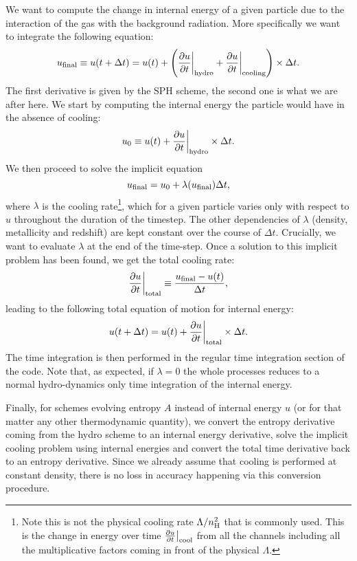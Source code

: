 \documentclass[fleqn, usenatbib, useAMS, a4paper]{mnras}
\begin{document}
We want to compute the change in internal energy of a given particle
due to the interaction of the gas with the background radiation. More
specifically we want to integrate the following equation:
\begin{equation}
  u_{\rm final} \equiv u(t+\Delta t) = u(t) + \left(\frac{\partial u}{\partial t}\bigg|_{\rm
    hydro} + \frac{\partial u}{\partial t}\bigg|_{\rm cooling}\right)
  \times \Delta t.
\end{equation}
The first derivative is given by the SPH scheme, the second one is
what we are after here. We start by computing the internal energy the
particle would have in the absence of cooling:
\begin{equation}
  u_0 \equiv u(t) + \frac{\partial u}{\partial t}\bigg|_{\rm
    hydro} \times \Delta t.
\end{equation}
We then proceed to solve the implicit equation
\begin{equation}
 u_{\rm final} = u_0 + \lambda(u_{\rm final}) \Delta t,
\end{equation}
where $\lambda$ is the cooling rate\footnote{Note this is not the
  physical cooling rate $\Lambda/n_{\rm H}^2$ that is commonly
  used. This is the change in energy over time $\frac{\partial
    u}{\partial t}\big|_{\rm cool}$ from all the channels
  including all the multiplicative factors coming in front of the
  physical $\Lambda$.}, which for a given particle varies
only with respect to $u$ throughout the duration of the timestep. The
other dependencies of $\lambda$ (density, metallicity and redshift)
are kept constant over the course of $\Delta t$. Crucially, we want to
evaluate $\lambda$ at the end of the time-step. Once a solution to this
implicit problem has been found, we get the total cooling rate:
\begin{equation}
  \frac{\partial u}{\partial t}\bigg|_{\rm total} \equiv \frac{u_{\rm final} -
    u(t)}{\Delta t},
\end{equation}
leading to the following total equation of motion for internal energy:
\begin{equation}
  u(t+\Delta t) = u(t) + \frac{\partial u}{\partial t}\bigg|_{\rm
    total} \times \Delta t.
\end{equation}
The time integration is then performed in the regular time integration
section of the code. Note that, as expected, if $\lambda=0$ the whole
processes reduces to a normal hydro-dynamics only time integration of
the internal energy.

Finally, for schemes evolving entropy $A$ instead of internal energy
$u$ (or for that matter any other thermodynamic quantity), we convert
the entropy derivative coming from the hydro scheme to an internal
energy derivative, solve the implicit cooling problem using internal
energies and convert the total time derivative back to an entropy
derivative. Since we already assume that cooling is performed at
constant density, there is no loss in accuracy happening via this
conversion procedure.
\end{document}
